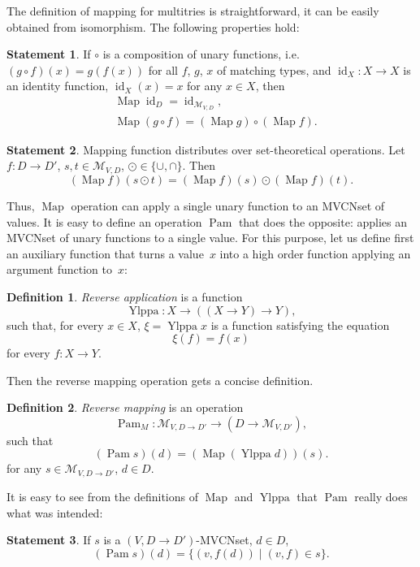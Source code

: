 \documentclass{article}
\theoremstyle{definition}
\newtheorem{Df}{Definition}
\newtheorem{St}{Statement}
\newcommand{\setcharmvcn}{M}
\newcommand{\setsymbol}[3]{\mathcal{#1}_{#2,#3}}
\newcommand{\setmvcn}[2]{\setsymbol{\setcharmvcn}{#1}{#2}}
\newcommand{\fmap}{\operatorname{Map}}
\newcommand{\fpam}{\operatorname{Pam}}
\newcommand{\id}{\operatorname{id}}
\newcommand{\ylppa}{\operatorname{Ylppa}}
\begin{document}
The definition of mapping for multitries is straightforward, it can be easily
obtained from isomorphism. The following properties hold:

\begin{St}\label{st:map-properties}
If $\circ$ is a composition of unary functions, i.e. $(g\circ f)(x) = g(f(x))$ for
all $f$, $g$, $x$ of matching types, and $\id_X : X \to X$ is an identity function,
$\id_X(x) = x$ for any $x\in X$, then
\begin{eqnarray*}
  & \fmap \id_D = \id_{\setmvcn{V}{D}} , \\
  & \fmap (g \circ f) = (\fmap g) \circ (\fmap f) .
\end{eqnarray*}
\end{St}

\begin{St}\label{st:map-distributivity}
Mapping function distributes over set-theoretical operations.
Let $f: D \to D'$, $s, t \in \setmvcn{V}{D}$, $\odot \in \{\cup, \cap \}$. Then
\[
  (\fmap f) (s \odot t) = (\fmap f)(s) \odot (\fmap f)(t) .
\]
\end{St}

Thus, $\fmap$ operation can apply a single unary function to an MVCNset of
values. It is easy to define an operation $\fpam$ that does the opposite:
applies an MVCNset of unary functions to a single value. For this purpose,
let us define first an auxiliary function that turns a value~$x$ into a
high order function applying an argument function to~$x$:

\begin{Df}\label{df:ylppa}
\emph{Reverse application} is a function
\[
  \ylppa : X \to ((X \to Y) \to Y),
\]
such that, for every $x\in X$, $\xi = \ylppa x$ is a function satisfying the
equation
\[
  \xi(f) = f(x)
\]
for every $f: X\to Y$.
\end{Df}

Then the reverse mapping operation gets a concise definition.

\begin{Df}\label{df:mvcn-pam}
\emph{Reverse mapping} is an operation
\[
  \fpam_{\setcharmvcn} : \setmvcn{V}{D \to D'} \to (D \to \setmvcn{V}{D'}),
\]
such that
\[
  (\fpam s)(d) = (\fmap (\ylppa d))(s) .
\]
for any $s\in \setmvcn{V}{D \to D'}$, $d\in D$.
\end{Df}

It is easy to see from the definitions of $\fmap$ and $\ylppa$ that $\fpam$
really does what was intended:

\begin{St}\label{st:mvcn-pam}
If $s$ is a $(V, D\to D')$-MVCNset, $d\in D$,
\[
  (\fpam s)(d) = \{ (v, f(d)) \mid (v, f) \in s \} .
\]
\end{St}
\end{document}
